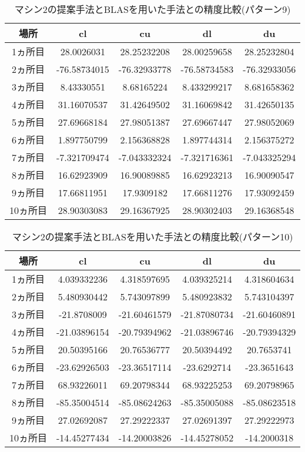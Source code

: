 \documentclass[11pt,a4paper]{jsreport}
\theoremstyle{definition}
\begin{document}
\begin{table}[H]
\centering
\begin{tabular}{|c|c|c|c|c|}
\hline
場所 & cl & cu & dl & du \\ \hline
1ヵ所目 & 28.0026031 & 28.25232208 & 28.00259658 & 28.25232804 \\ \hline
2ヵ所目 & -76.58734015 & -76.32933778 & -76.58734583 & -76.32933056 \\ \hline
3ヵ所目 & 8.43330551 & 8.68165224 & 8.433299217 & 8.681658362 \\ \hline
4ヵ所目 & 31.16070537 & 31.42649502 & 31.16069842 & 31.42650135 \\ \hline
5ヵ所目 & 27.69668184 & 27.98051387 & 27.69667447 & 27.98052069 \\ \hline
6ヵ所目 & 1.897750799 & 2.156368828 & 1.897744314 & 2.156375272 \\ \hline
7ヵ所目 & -7.321709474 & -7.043332324 & -7.321716361 & -7.043325294 \\ \hline
8ヵ所目 & 16.62923909 & 16.90089885 & 16.62923213 & 16.90090547 \\ \hline
9ヵ所目 & 17.66811951 & 17.9309182 & 17.66811276 & 17.93092459 \\ \hline
10ヵ所目 & 28.90303083 & 29.16367925 & 28.90302403 & 29.16368548 \\ \hline
\end{tabular}
\caption{マシン2の提案手法とBLASを用いた手法との精度比較(パターン9)}
\end{table}

\begin{table}[H]
\centering
\begin{tabular}{|c|c|c|c|c|}
\hline
場所 & cl & cu & dl & du \\ \hline
1ヵ所目 & 4.039332236 & 4.318597695 & 4.039325214 & 4.318604634 \\ \hline
2ヵ所目 & 5.480930442 & 5.743097899 & 5.480923832 & 5.743104397 \\ \hline
3ヵ所目 & -21.8708009 & -21.60461579 & -21.87080734 & -21.60460891 \\ \hline
4ヵ所目 & -21.03896154 & -20.79394962 & -21.03896746 & -20.79394329 \\ \hline
5ヵ所目 & 20.50395166 & 20.76536777 & 20.50394492 & 20.7653741 \\ \hline
6ヵ所目 & -23.62926503 & -23.36517114 & -23.6292714 & -23.3651643 \\ \hline
7ヵ所目 & 68.93226011 & 69.20798344 & 68.93225253 & 69.20798965 \\ \hline
8ヵ所目 & -85.35004514 & -85.08624263 & -85.35005088 & -85.08623518 \\ \hline
9ヵ所目 & 27.02692087 & 27.29222337 & 27.02691397 & 27.29222973 \\ \hline
10ヵ所目 & -14.45277434 & -14.20003826 & -14.45278052 & -14.2000318 \\ \hline
\end{tabular}
\caption{マシン2の提案手法とBLASを用いた手法との精度比較(パターン10)}
\end{table}
\end{document}
